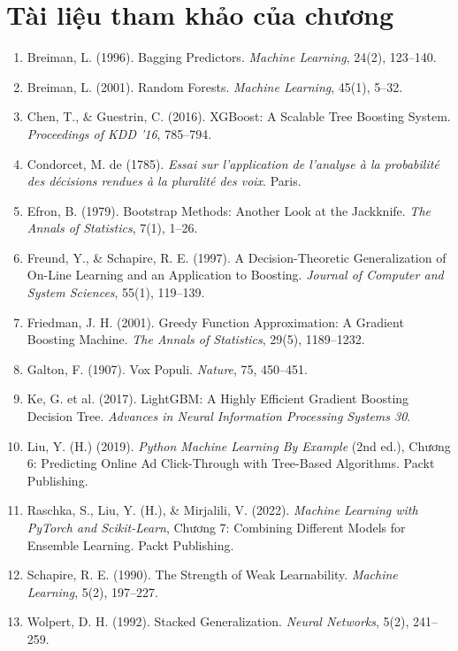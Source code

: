 \section*{Tài liệu tham khảo của chương}
\begin{enumerate}
    \item Breiman, L. (1996). Bagging Predictors. \textit{Machine Learning}, 24(2), 123--140.
    \item Breiman, L. (2001). Random Forests. \textit{Machine Learning}, 45(1), 5--32.
    \item Chen, T., \& Guestrin, C. (2016). XGBoost: A Scalable Tree Boosting System. \textit{Proceedings of KDD '16}, 785--794.
    \item Condorcet, M. de (1785). \textit{Essai sur l'application de l'analyse à la probabilité des décisions rendues à la pluralité des voix}. Paris.
    \item Efron, B. (1979). Bootstrap Methods: Another Look at the Jackknife. \textit{The Annals of Statistics}, 7(1), 1--26.
    \item Freund, Y., \& Schapire, R. E. (1997). A Decision-Theoretic Generalization of On-Line Learning and an Application to Boosting. \textit{Journal of Computer and System Sciences}, 55(1), 119--139.
    \item Friedman, J. H. (2001). Greedy Function Approximation: A Gradient Boosting Machine. \textit{The Annals of Statistics}, 29(5), 1189--1232.
    \item Galton, F. (1907). Vox Populi. \textit{Nature}, 75, 450--451.
    \item Ke, G. et al. (2017). LightGBM: A Highly Efficient Gradient Boosting Decision Tree. \textit{Advances in Neural Information Processing Systems 30}.
    \item Liu, Y. (H.) (2019). \textit{Python Machine Learning By Example} (2nd ed.), Chương 6: Predicting Online Ad Click-Through with Tree-Based Algorithms. Packt Publishing.
    \item Raschka, S., Liu, Y. (H.), \& Mirjalili, V. (2022). \textit{Machine Learning with PyTorch and Scikit-Learn}, Chương 7: Combining Different Models for Ensemble Learning. Packt Publishing.
    \item Schapire, R. E. (1990). The Strength of Weak Learnability. \textit{Machine Learning}, 5(2), 197--227.
    \item Wolpert, D. H. (1992). Stacked Generalization. \textit{Neural Networks}, 5(2), 241--259.
\end{enumerate}
